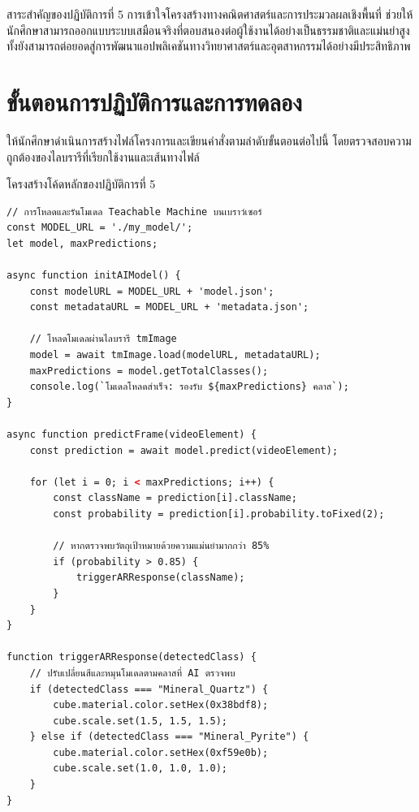 \begin{conceptbox}{สาระสำคัญของปฏิบัติการที่ 5}
การเข้าใจโครงสร้างทางคณิตศาสตร์และการประมวลผลเชิงพื้นที่ ช่วยให้นักศึกษาสามารถออกแบบระบบเสมือนจริงที่ตอบสนองต่อผู้ใช้งานได้อย่างเป็นธรรมชาติและแม่นยำสูง ทั้งยังสามารถต่อยอดสู่การพัฒนาแอปพลิเคชันทางวิทยาศาสตร์และอุตสาหกรรมได้อย่างมีประสิทธิภาพ
\end{conceptbox}

\section{ขั้นตอนการปฏิบัติการและการทดลอง}

ให้นักศึกษาดำเนินการสร้างไฟล์โครงการและเขียนคำสั่งตามลำดับขั้นตอนต่อไปนี้ โดยตรวจสอบความถูกต้องของไลบรารีที่เรียกใช้งานและเส้นทางไฟล์

\begin{codebox}{โครงสร้างโค้ดหลักของปฏิบัติการที่ 5}
\begin{lstlisting}[language=HTML]
// การโหลดและรันโมเดล Teachable Machine บนเบราว์เซอร์
const MODEL_URL = './my_model/';
let model, maxPredictions;

async function initAIModel() {
    const modelURL = MODEL_URL + 'model.json';
    const metadataURL = MODEL_URL + 'metadata.json';

    // โหลดโมเดลผ่านไลบรารี tmImage
    model = await tmImage.load(modelURL, metadataURL);
    maxPredictions = model.getTotalClasses();
    console.log(`โมเดลโหลดสำเร็จ: รองรับ ${maxPredictions} คลาส`);
}

async function predictFrame(videoElement) {
    const prediction = await model.predict(videoElement);
    
    for (let i = 0; i < maxPredictions; i++) {
        const className = prediction[i].className;
        const probability = prediction[i].probability.toFixed(2);
        
        // หากตรวจพบวัตถุเป้าหมายด้วยความแม่นยำมากกว่า 85%
        if (probability > 0.85) {
            triggerARResponse(className);
        }
    }
}

function triggerARResponse(detectedClass) {
    // ปรับเปลี่ยนสีและหมุนโมเดลตามคลาสที่ AI ตรวจพบ
    if (detectedClass === "Mineral_Quartz") {
        cube.material.color.setHex(0x38bdf8);
        cube.scale.set(1.5, 1.5, 1.5);
    } else if (detectedClass === "Mineral_Pyrite") {
        cube.material.color.setHex(0xf59e0b);
        cube.scale.set(1.0, 1.0, 1.0);
    }
}
\end{lstlisting}
\end{codebox}

